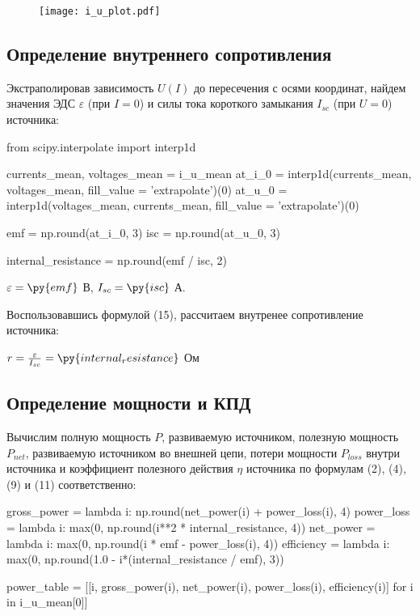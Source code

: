 \documentclass[12pt, a4paper]{article}
\begin{document}
\begin{figure}[H]
\texttt{[image: i\_u\_plot.pdf]}
\end{figure}

\subsection*{Определение внутреннего сопротивления}

Экстраполировав зависимость $U(I)$ до пересечения с осями координат,
найдем значения ЭДС $\varepsilon$ (при $I = 0$) и силы тока
короткого замыкания $I_{sc}$ (при $U = 0$) источника:

\begin{pycode}
from scipy.interpolate import interp1d

currents_mean, voltages_mean = i_u_mean
at_i_0 = interp1d(currents_mean, voltages_mean, fill_value = 'extrapolate')(0)
at_u_0 = interp1d(voltages_mean, currents_mean, fill_value = 'extrapolate')(0)

emf = np.round(at_i_0, 3)
isc = np.round(at_u_0, 3)

internal_resistance = np.round(emf / isc, 2)
\end{pycode}

\noindent
$\varepsilon = \py{emf}$ В, $I_{sc} = \py{isc}$ А.

Воспользовавшись формулой (15), рассчитаем внутренее сопротивление источника:

\noindent
$r = \frac{\varepsilon}{I_{sc}} = \py{internal_resistance}$ Ом

\subsection*{Определение мощности и КПД}  

Вычислим полную мощность $P$, развиваемую источником, полезную мощность $P_{net}$,
развиваемую источником во внешней цепи, потери мощности $P_{loss}$ внутри
источника и коэффициент полезного действия $\eta$ источника
по формулам (2), (4), (9) и (11) соответственно:

\begin{pycode}
gross_power = lambda i: np.round(net_power(i) + power_loss(i), 4)
power_loss = lambda i: max(0, np.round(i**2 * internal_resistance, 4))
net_power = lambda i: max(0, np.round(i * emf - power_loss(i), 4))
efficiency = lambda i: max(0, np.round(1.0 - i*(internal_resistance / emf), 3))

power_table = [[i, gross_power(i), net_power(i), power_loss(i), efficiency(i)] for i in i_u_mean[0]]
\end{pycode}
\end{document}

